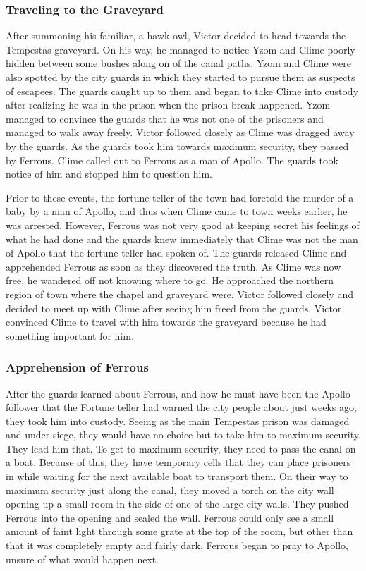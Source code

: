 \subsubsection{Traveling to the Graveyard}

After summoning his familiar, a hawk owl, Victor decided to head towards the Tempestas graveyard. On his way, he managed to notice Yzom and Clime poorly hidden between some bushes along on of the canal paths. Yzom and Clime were also spotted by the city guards in which they started to pursue them as suspects of escapees. The guards caught up to them and began to take Clime into custody after realizing he was in the prison when the prison break happened. Yzom managed to convince the guards that he was not one of the prisoners and managed to walk away freely. Victor followed closely as Clime was dragged away by the guards. As the guards took him towards maximum security, they passed by Ferrous. Clime called out to Ferrous as a man of Apollo. The guards took notice of him and stopped him to question him. 

Prior to these events, the fortune teller of the town had foretold the murder of a baby by a man of Apollo, and thus when Clime came to town weeks earlier, he was arrested. However, Ferrous was not very good at keeping secret his feelings of what he had done and the guards knew immediately that Clime was not the man of Apollo that the fortune teller had spoken of. The guards released Clime and apprehended Ferrous as soon as they discovered the truth. As Clime was now free, he wandered off not knowing where to go. He approached the northern region of town where the chapel and graveyard were. Victor followed closely and decided to meet up with Clime after seeing him freed from the guards. Victor convinced Clime to travel with him towards the graveyard because he had something important for him.

\subsubsection{Apprehension of Ferrous}

After the guards learned about Ferrous, and how he must have been the Apollo follower that the Fortune teller had warned the city people about just weeks ago, they took him into custody. Seeing as the main Tempestas prison was damaged and under siege, they would have no choice but to take him to maximum security. They lead him that. To get to maximum security, they need to pass the canal on a boat. Because of this, they have temporary cells that they can place prisoners in while waiting for the next available boat to transport them. On their way to maximum security just along the canal, they moved a torch on the city wall opening up a small room in the side of one of the large city walls. They pushed Ferrous into the opening and sealed the wall. Ferrous could only see a small amount of faint light through some grate at the top of the room, but other than that it was completely empty and fairly dark. Ferrous began to pray to Apollo, unsure of what would happen next.

